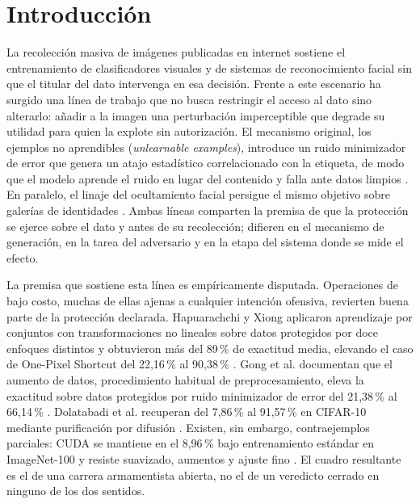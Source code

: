 \documentclass[pdflatex,sn-mathphys-num]{sn-jnl}
\theoremstyle{thmstyleone}
\theoremstyle{thmstyletwo}
\theoremstyle{thmstylethree}
\begin{document}
\maketitle

\section{Introducción}\label{sec:intro}

La recolección masiva de imágenes publicadas en internet sostiene el entrenamiento de clasificadores visuales y de sistemas de reconocimiento facial sin que el titular del dato intervenga en esa decisión. Frente a este escenario ha surgido una línea de trabajo que no busca restringir el acceso al dato sino alterarlo: añadir a la imagen una perturbación imperceptible que degrade su utilidad para quien la explote sin autorización. El mecanismo original, los ejemplos no aprendibles (\emph{unlearnable examples}), introduce un ruido minimizador de error que genera un atajo estadístico correlacionado con la etiqueta, de modo que el modelo aprende el ruido en lugar del contenido y falla ante datos limpios \cite{huang2021unlearnable}. En paralelo, el linaje del ocultamiento facial persigue el mismo objetivo sobre galerías de identidades \cite{shan2020fawkes}. Ambas líneas comparten la premisa de que la protección se ejerce sobre el dato y antes de su recolección; difieren en el mecanismo de generación, en la tarea del adversario y en la etapa del sistema donde se mide el efecto.

La premisa que sostiene esta línea es empíricamente disputada. Operaciones de bajo costo, muchas de ellas ajenas a cualquier intención ofensiva, revierten buena parte de la protección declarada. Hapuarachchi y Xiong aplicaron aprendizaje por conjuntos con transformaciones no lineales sobre datos protegidos por doce enfoques distintos y obtuvieron más del 89\,\% de exactitud media, elevando el caso de One-Pixel Shortcut del 22,16\,\% al 90,38\,\% \cite{hapuarachchi2025advancing,wu2023onepixel}. Gong et al. documentan que el aumento de datos, procedimiento habitual de preprocesamiento, eleva la exactitud sobre datos protegidos por ruido minimizador de error del 21,38\,\% al 66,14\,\% \cite{gong2026armor}. Dolatabadi et al. recuperan del 7,86\,\% al 91,57\,\% en CIFAR-10 mediante purificación por difusión \cite{dolatabadi2024devil}. Existen, sin embargo, contraejemplos parciales: CUDA se mantiene en el 8,96\,\% bajo entrenamiento estándar en ImageNet-100 y resiste suavizado, aumentos y ajuste fino \cite{sadasivan2023cuda}. El cuadro resultante es el de una carrera armamentista abierta, no el de un veredicto cerrado en ninguno de los dos sentidos.
\end{document}
